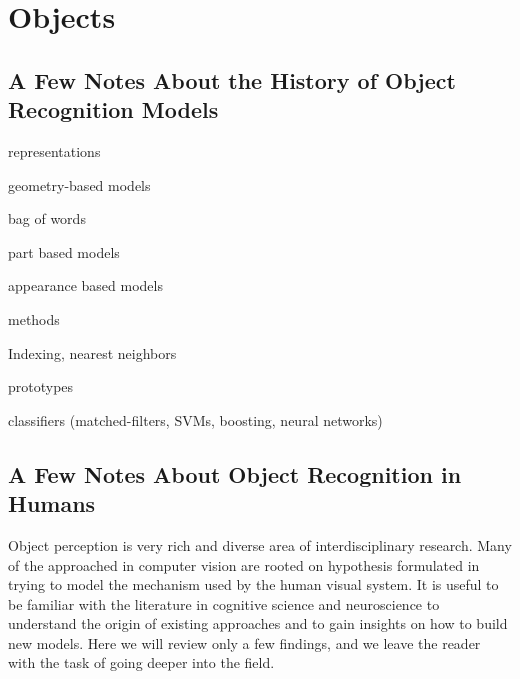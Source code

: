 %	
%	
%	 
%



\chapter{Objects}


\section{A Few Notes About the History of Object Recognition Models}


representations

geometry-based models

bag of words

part based models

appearance based models

methods

Indexing, nearest neighbors

prototypes

classifiers (matched-filters, SVMs, boosting, neural networks)



\section{A Few Notes About Object Recognition in Humans}

Object perception is very rich and diverse area of interdisciplinary research. Many of the approached in computer vision are rooted on hypothesis formulated in trying to model the mechanism used by the human visual system. It is useful to be familiar with the literature in cognitive science and neuroscience to understand the origin of existing approaches and to gain insights on how to build new models. Here we will review only a few findings, and we leave the reader with the task of going deeper into the field.


